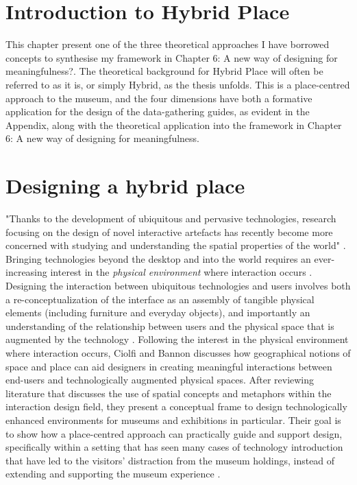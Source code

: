 
\section{Introduction to Hybrid Place}
This chapter present one of the three theoretical approaches I have borrowed concepts to synthesise my framework in Chapter 6: A new way of designing for meaningfulness?. The theoretical background for Hybrid Place will often be referred to as it is, or simply Hybrid, as the thesis unfolds. This is a place-centred approach to the museum, and the four dimensions have both a formative application for the design of the data-gathering guides, as evident in the Appendix, along with the theoretical application into the framework in Chapter 6: A new way of designing for meaningfulness.


\section{Designing a hybrid place}
"Thanks to the development of ubiquitous and pervasive technologies, research focusing on the design of novel interactive artefacts has recently become more concerned with studying and understanding the spatial properties of the world" \autocite[p. 159]{hybridplace_ciolfi}. Bringing technologies beyond the desktop and into the world requires an ever-increasing interest in the \emph{physical environment} where interaction occurs \autocite[p. 159]{hybridplace_ciolfi}. Designing the interaction between ubiquitous technologies and users involves both a re-conceptualization of the interface as an assembly of tangible physical elements (including furniture and everyday objects), and importantly an understanding of the relationship between users and the physical space that is augmented by the technology \autocite[p. 159]{hybridplace_ciolfi}. Following the interest in the physical environment where interaction occurs, Ciolfi and Bannon discusses how geographical notions of space and place can aid designers in creating meaningful interactions between end-users and technologically augmented physical spaces. After reviewing literature that discusses the use of spatial concepts and metaphors within the interaction design field, they present a conceptual frame to design technologically enhanced environments for museums and exhibitions in particular. Their goal is to show how a place-centred approach can practically guide and support design, specifically within a setting that has seen many cases of technology introduction that have led to the visitors' distraction from the museum holdings, instead of extending and supporting the museum experience \autocite[p. 159-160]{hybridplace_ciolfi}.


